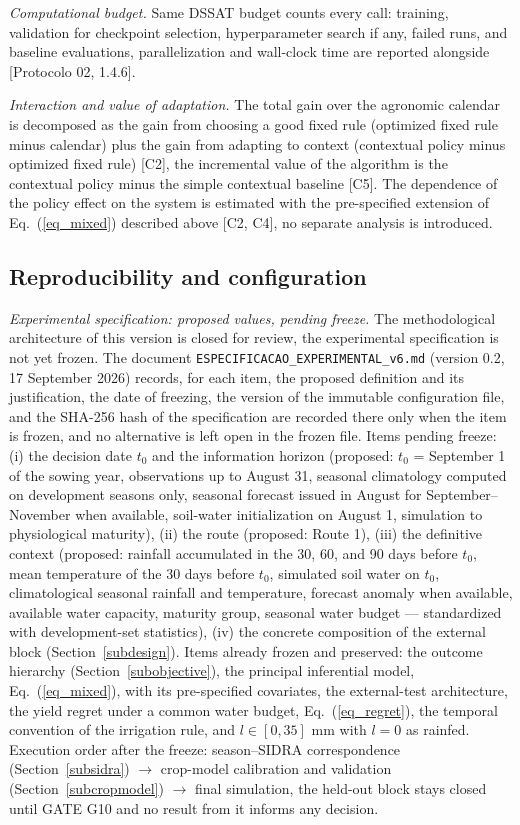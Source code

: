 \documentclass[times,final,authoryear]{elsarticle}
\begin{document}
\emph{Computational budget.} Same DSSAT budget counts every call: training, validation for checkpoint selection, hyperparameter search if any, failed runs, and baseline evaluations, parallelization and wall-clock time are reported alongside [Protocolo 02, 1.4.6].

\emph{Interaction and value of adaptation.} The total gain over the agronomic calendar is decomposed as the gain from choosing a good fixed rule (optimized fixed rule minus calendar) plus the gain from adapting to context (contextual policy minus optimized fixed rule) [C2], the incremental value of the algorithm is the contextual policy minus the simple contextual baseline [C5]. The dependence of the policy effect on the system is estimated with the pre-specified extension of Eq.~(\ref{eq_mixed}) described above [C2, C4], no separate analysis is introduced.


\subsection{Reproducibility and configuration}
\label{subrepro}

\emph{Experimental specification: proposed values, pending freeze.} The methodological architecture of this version is closed for review, the experimental specification is not yet frozen. The document \texttt{ESPECIFICACAO\_EXPERIMENTAL\_v6.md} (version 0.2, 17 September 2026) records, for each item, the proposed definition and its justification, the date of freezing, the version of the immutable configuration file, and the SHA-256 hash of the specification are recorded there only when the item is frozen, and no alternative is left open in the frozen file. Items pending freeze: (i) the decision date $t_0$ and the information horizon (proposed: $t_0$ = September 1 of the sowing year, observations up to August 31, seasonal climatology computed on development seasons only, seasonal forecast issued in August for September--November when available, soil-water initialization on August 1, simulation to physiological maturity), (ii) the route (proposed: Route 1), (iii) the definitive context (proposed: rainfall accumulated in the 30, 60, and 90 days before $t_0$, mean temperature of the 30 days before $t_0$, simulated soil water on $t_0$, climatological seasonal rainfall and temperature, forecast anomaly when available, available water capacity, maturity group, seasonal water budget --- standardized with development-set statistics), (iv) the concrete composition of the external block (Section~\ref{subdesign}). Items already frozen and preserved: the outcome hierarchy (Section~\ref{subobjective}), the principal inferential model, Eq.~(\ref{eq_mixed}), with its pre-specified covariates, the external-test architecture, the yield regret under a common water budget, Eq.~(\ref{eq_regret}), the temporal convention of the irrigation rule, and $l \in [0, 35]$ mm with $l = 0$ as rainfed. Execution order after the freeze: season--SIDRA correspondence (Section~\ref{subsidra}) $\rightarrow$ crop-model calibration and validation (Section~\ref{subcropmodel}) $\rightarrow$ final simulation, the held-out block stays closed until GATE G10 and no result from it informs any decision.
\end{document}
